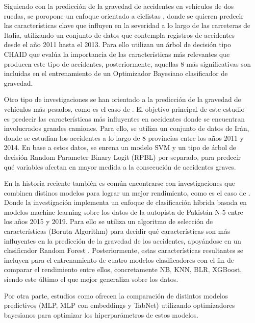 \documentclass{uathesis-es}
\begin{document}
Siguiendo con la predicción de la gravedad de accidentes en vehículos de dos ruedas, se poropone un enfoque orientado a ciclistas \cite{prati2017using}, donde se quieren predecir las características clave que influyen en la severidad a lo largo de las carreteras de Italia, utilizando un conjunto de datos que contempla registros de accidentes desde el año 2011 hasta el 2013. Para ello utilizan un árbol de decisión tipo CHAID que evalúa la importancia de las características más relevantes que producen este tipo de accidentes, posteriormente, aquellas 8 más significativas son incluidas en el entrenamiento de un Optimizador Bayesiano clasificador de gravedad.

Otro tipo de investigaciones se han orientado a la predicción de la gravedad de vehículos más pesados, como es el caso de \cite{hosseinzadeh2021investigating}. El objetivo principal de este estudio es predecir las características más influyentes en accidentes donde se encuentran involucrados grandes camiones. Para ello, se utiliza un conjunto de datos de Irán, donde se estudian los accidentes a lo largo de 8 provincias entre los años 2011 y 2014. En base a estos datos, se enrena un modelo SVM y un tipo de árbol de decisión Random Parameter Binary Logit (RPBL) por separado, para predecir qué variables afectan en mayor medida a la consecución de accidentes graves. 

En la historia reciente también es común encontrarse con investigaciones que combinen distinos modelos para lograr un mejor rendimiento, como es el caso de . Donde la investigación implementa un enfoque de clasificación híbrida basada en modelos machine learning sobre los datos de la autopista de Pakistán N-5 entre los años 2015 y 2019. Para ello se utiliza un algoritmo de selección de características (Boruta Algorithm) para decidir qué características son más influyentes en la predicción de la gravedad de los accidentes, apoyándose en un clasificador Random Forest \cite{zhang2022hybrid}. Posteriormente, estas características resultantes se incluyen para el entrenamiento de cuatro modelos clasificadores con el fin de comparar el rendimiento entre ellos, concretamente NB, KNN, BLR, XGBoost, siendo este último el que mejor generaliza sobre los datos.


Por otra parte, estudios como \cite{Sattar2023} ofrecen la comparación de distintos modelos predictivos (MLP, MLP con embeddings y TabNet) utilizando optimizadores bayesianos para optimizar los hiperparámetros de estos modelos.
\end{document}
